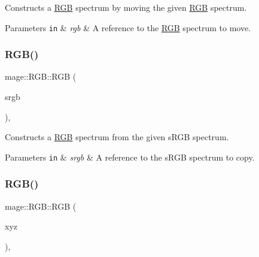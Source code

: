 Constructs a \hyperlink{structmage_1_1_r_g_b}{R\+GB} spectrum by moving the given \hyperlink{structmage_1_1_r_g_b}{R\+GB} spectrum.


\begin{DoxyParams}[1]{Parameters}
\mbox{\tt in}  & {\em rgb} & A reference to the \hyperlink{structmage_1_1_r_g_b}{R\+GB} spectrum to move. \\
\hline
\end{DoxyParams}
\hypertarget{structmage_1_1_r_g_b_a2f2c4eea3b0c44e0f31cfe20c6371d64}{}\label{structmage_1_1_r_g_b_a2f2c4eea3b0c44e0f31cfe20c6371d64} 
\subsubsection{\texorpdfstring{R\+G\+B()}{RGB()}\hspace{0.1cm}{\footnotesize\ttfamily [5/7]}}
{\footnotesize\ttfamily mage\+::\+R\+G\+B\+::\+R\+GB (\begin{DoxyParamCaption}\item[{const \hyperlink{structmage_1_1_s_r_g_b}{S\+R\+GB} \&}]{srgb }\end{DoxyParamCaption})\hspace{0.3cm}{\ttfamily [explicit]}, {\ttfamily [noexcept]}}

Constructs a \hyperlink{structmage_1_1_r_g_b}{R\+GB} spectrum from the given s\+R\+GB spectrum.


\begin{DoxyParams}[1]{Parameters}
\mbox{\tt in}  & {\em srgb} & A reference to the s\+R\+GB spectrum to copy. \\
\hline
\end{DoxyParams}
\hypertarget{structmage_1_1_r_g_b_a62a2200960f84f1b6bd4b743510201a4}{}\label{structmage_1_1_r_g_b_a62a2200960f84f1b6bd4b743510201a4} 
\subsubsection{\texorpdfstring{R\+G\+B()}{RGB()}\hspace{0.1cm}{\footnotesize\ttfamily [6/7]}}
{\footnotesize\ttfamily mage\+::\+R\+G\+B\+::\+R\+GB (\begin{DoxyParamCaption}\item[{const \hyperlink{structmage_1_1_x_y_z}{X\+YZ} \&}]{xyz }\end{DoxyParamCaption})\hspace{0.3cm}{\ttfamily [explicit]}, {\ttfamily [noexcept]}}

